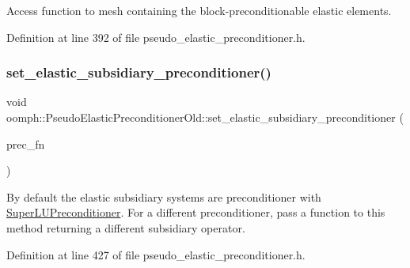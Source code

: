 Access function to mesh containing the block-\/preconditionable elastic elements. 



Definition at line 392 of file pseudo\+\_\+elastic\+\_\+preconditioner.\+h.

\mbox{\label{classoomph_1_1PseudoElasticPreconditionerOld_aae1c5f984fee69fca7cd9719ed2222a4}} 
\subsubsection{\texorpdfstring{set\+\_\+elastic\+\_\+subsidiary\+\_\+preconditioner()}{set\_elastic\_subsidiary\_preconditioner()}}
{\footnotesize\ttfamily void oomph\+::\+Pseudo\+Elastic\+Preconditioner\+Old\+::set\+\_\+elastic\+\_\+subsidiary\+\_\+preconditioner (\begin{DoxyParamCaption}\item[{\hyperlink{classoomph_1_1PseudoElasticPreconditionerOld_a8ee80a4a55139190a6e2a16fa175e75f}{Subsidiary\+Preconditioner\+Fct\+Pt}}]{prec\+\_\+fn }\end{DoxyParamCaption})\hspace{0.3cm}{\ttfamily [inline]}}



By default the elastic subsidiary systems are preconditioner with \hyperlink{classoomph_1_1SuperLUPreconditioner}{Super\+L\+U\+Preconditioner}. For a different preconditioner, pass a function to this method returning a different subsidiary operator. 



Definition at line 427 of file pseudo\+\_\+elastic\+\_\+preconditioner.\+h.

\mbox{\label{classoomph_1_1PseudoElasticPreconditionerOld_a432b5e0501644ae3fa6a9dadd8f52c60}} 
